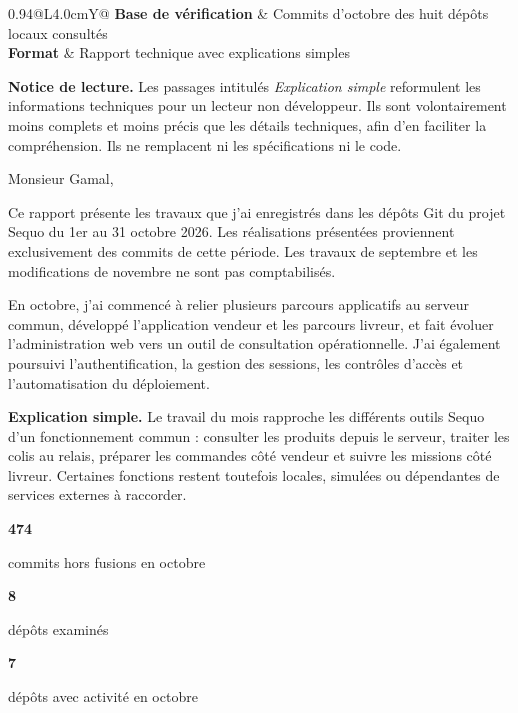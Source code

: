 \documentclass[11pt,letterpaper]{article}
\newcommand{\sectiontitle}[1]{\vspace{0.45em}{\Large\bfseries\color{SequoInk}#1}\par\vspace{0.1em}}
\newcommand{\simpleexplanation}[1]{{\small\textbf{\color{SequoBlue}Explication simple.} \color{SequoMuted}#1\par}}
\newcommand{\metric}[2]{\begin{minipage}[t]{0.30\linewidth}{\LARGE\bfseries\color{SequoGreen}#1}\par{\small\color{SequoMuted}#2}\end{minipage}}
\begin{document}
\begin{titlepage}
{\begin{tabularx}{0.94\linewidth}{@{}L{4.0cm}Y@{}}
    \textbf{Base de vérification} & Commits d'octobre des huit dépôts locaux consultés \\
    \textbf{Format} & Rapport technique avec explications simples \\
    \bottomrule
  \end{tabularx}}\par
  \vspace{0.55cm}
  {\small\textbf{Notice de lecture.} Les passages intitulés \textit{Explication simple} reformulent les informations techniques pour un lecteur non développeur. Ils sont volontairement moins complets et moins précis que les détails techniques, afin d'en faciliter la compréhension. Ils ne remplacent ni les spécifications ni le code.}
\end{titlepage}

\sectiontitle{Périmètre et résumé exécutif}
Monsieur Gamal,

Ce rapport présente les travaux que j'ai enregistrés dans les dépôts Git du projet Sequo du 1er au 31 octobre 2026. Les réalisations présentées proviennent exclusivement des commits de cette période. Les travaux de septembre et les modifications de novembre ne sont pas comptabilisés.

En octobre, j'ai commencé à relier plusieurs parcours applicatifs au serveur commun, développé l'application vendeur et les parcours livreur, et fait évoluer l'administration web vers un outil de consultation opérationnelle. J'ai également poursuivi l'authentification, la gestion des sessions, les contrôles d'accès et l'automatisation du déploiement.

\simpleexplanation{Le travail du mois rapproche les différents outils Sequo d'un fonctionnement commun : consulter les produits depuis le serveur, traiter les colis au relais, préparer les commandes côté vendeur et suivre les missions côté livreur. Certaines fonctions restent toutefois locales, simulées ou dépendantes de services externes à raccorder.}

\vspace{0.5em}
\metric{474}{commits hors fusions en octobre}\hfill
\metric{8}{dépôts examinés}\hfill
\metric{7}{dépôts avec activité en octobre}
\par\vspace{0.65em}
\end{document}
